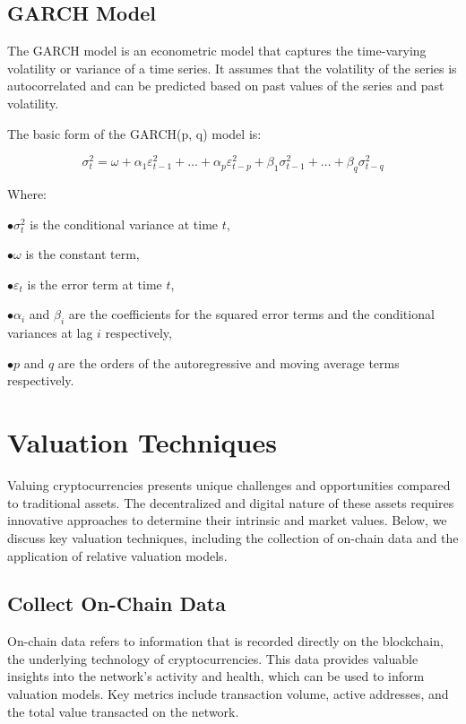 \documentclass{ledger}
\begin{document}
\subsection{GARCH Model}

\hfill \break

The GARCH model is an econometric model that captures the time-varying volatility or variance of a time series. It assumes that the volatility of the series is autocorrelated and can be predicted based on past values of the series and past volatility.

The basic form of the GARCH(p, q) model is:

\[
\sigma_{t}^2 = \omega + \alpha_{1}\varepsilon_{t-1}^2 + \ldots + \alpha_{p}\varepsilon_{t-p}^2 + \beta_{1}\sigma_{t-1}^2 + \ldots + \beta_{q}\sigma_{t-q}^2
\]

Where:

$ \bullet \sigma_{t}^2 $ is the conditional variance at time $ t $,

$ \bullet \omega $ is the constant term,

$ \bullet \varepsilon_{t} $ is the error term at time $ t $,

$ \bullet \alpha_{i} $ and $ \beta_{i} $ are the coefficients for the squared error terms and the conditional variances at lag $ i $ respectively,

$ \bullet p $ and $ q $ are the orders of the autoregressive and moving average terms respectively.


\section{Valuation Techniques}

Valuing cryptocurrencies presents unique challenges and opportunities compared to traditional assets. The decentralized and digital nature of these assets requires innovative approaches to determine their intrinsic and market values. Below, we discuss key valuation techniques, including the collection of on-chain data and the application of relative valuation models.

\subsection{Collect On-Chain Data}

On-chain data refers to information that is recorded directly on the blockchain, the underlying technology of cryptocurrencies. This data provides valuable insights into the network's activity and health, which can be used to inform valuation models. Key metrics include transaction volume, active addresses, and the total value transacted on the network.
\end{document}
